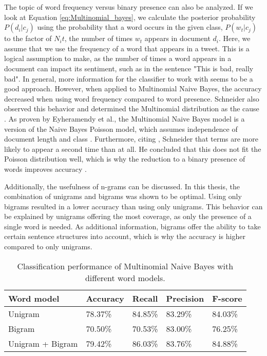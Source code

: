 The topic of word frequency versus binary presence can also be analyzed. If we look at Equation \eqref{eq:Multinomial_bayes}, we calculate the posterior probability $P(d_i|c_j)$ using the probability that a word occurs in the given class, $P(w_t|c_j)$ to the factor of $N_it$, the number of times $w_t$ appears in document $d_i$. Here, we assume that we use the frequency of a word that appears in a tweet. This is a logical assumption to make, as the number of times a word appears in a document can impact its sentiment, such as in the sentence "This is bad, really bad". In general, more information for the classifier to work with seems to be a good approach. However, when applied to Multinomial Naive Bayes, the accuracy decreased when using word frequency compared to word presence. Schneider also observed this behavior and determined the Multinomial distribution as the cause \cite{nb_freq}. As proven by Eyheramendy et al., the Multinomial Naive Bayes model is a version of the Naive Bayes Poisson model, which assumes independence of document length and class \cite{Poisson}. Furthermore, citing \cite{Poisson_words}, Schneider  that terms are more likely to appear a second time than at all. He concluded that this does not fit the Poisson distribution well, which is why the reduction to a binary presence of words improves accuracy \cite{nb_freq}.

Additionally, the usefulness of n-grams can be discussed. In this thesis, the combination of unigrams and bigrams was shown to be optimal. Using only bigrams resulted in a lower accuracy than using only unigrams. This behavior can be explained by unigrams offering the most coverage, as only the presence of a single word is needed. As additional information, bigrams offer the ability to take certain sentence structures into account, which is why the accuracy is higher compared to only unigrams.

\begin{table}
\centering
\caption{Classification performance of Multinomial Naive Bayes with different word models.}
\begin{tabular}{ |p{4cm}||p{2cm}|p{2cm}|p{2cm}|p{2cm}| }
 \hline
 Word model &     Accuracy &      Recall &     Precision& F-score \\
 \hline
 Unigram & 78.37\% & 84.85\% & 83.29\% & 84.03\% \\
  \hline
 Bigram & 70.50\% & 70.53\% & 83.00\% & 76.25\% \\
 \hline
 Unigram + Bigram  & 79.42\%&        86.03\%&       83.76\%& 84.88\%\\
 \hline
\end{tabular}
\label{tab:evaluations_euqal}
\end{table}


